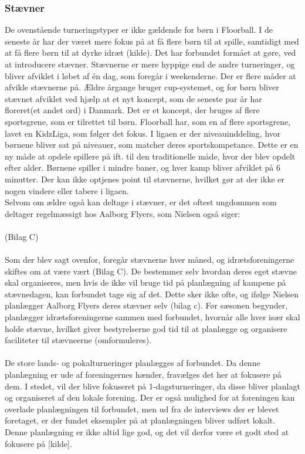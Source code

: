 \subsubsection{Stævner}
De ovenstående turneringstyper er ikke gældende for børn i Floorball. I de seneste år har der været mere fokus på at få flere børn til at spille, samtidigt med at få flere børn til at dyrke idræt (kilde). Det har forbundet formået at gøre, ved at introducere stævner. Stævnerne er mere hyppige end de andre turneringer, og bliver  afviklet i løbet af én dag, som foregår i weekenderne. Der er flere måder at afvikle stævnerne på. Ældre årgange bruger cup-systemet, og for børn bliver stævnet afviklet ved hjælp at et nyt koncept, som de seneste par år har floreret(et andet ord) i Danmark. Det er et koncept, der bruges af flere sportsgrene, som er tilrettet til børn.
Floorball har, som en af flere sportsgrene, lavet en KidzLiga, som følger det fokus. I ligaen er der niveauinddeling, hvor børnene bliver sat på niveauer, som matcher deres sportskompetance. Dette er en ny måde at opdele spillere på ift. til den traditionelle måde, hvor der blev opdelt efter alder. 
Børnene spiller i mindre baner, og hver kamp bliver afviklet på 6 minutter. Der kan ikke optjenes point til stævnerne, hvilket gør at der ikke er nogen vindere eller tabere i ligaen. 
\\
Selvom om ældre også kan deltage i stævner, er det oftest ungdommen som deltager regelmæssigt hos Aalborg Flyers, som Nielsen også siger: 
\\\\
 (Bilag C)
\\\\
Som der blev sagt ovenfor, foregår stævnerne hver måned, og idrætsforeningerne skiftes om at være vært (Bilag C). De bestemmer selv hvordan deres eget stævne skal organiseres, men hvis de ikke vil bruge tid på planlægning af kampene på stævnedagen, kan forbundet tage sig af det. Dette sker ikke ofte, og ifølge Nielsen planlægger Aalborg Flyers deres stævner selv (bilag c). Før sæsonen begynder, planlægger idrætsforeningerne sammen med forbundet, hvornår alle hver især skal holde stævne, hvilket giver bestyrelserne god tid til at planlægge og organisere faciliteter til stævneerne (omformuleres). 
\\\\ %
De store lands- og pokalturneringer planlægges af forbundet. Da denne planlægning er ude af foreningernes hænder, fravælges det her at fokusere på dem. I stedet, vil der blive fokuseret på 1-dagsturneringer, da disse bliver planlagt og organiseret af den lokale forening. Der er også mulighed for at foreningen kan overlade planlægningen til forbundet, men ud fra de interviews der er blevet foretaget, er der fundet eksempler på at planlægningen bliver udført lokalt. Denne planlægning er ikke altid lige god, og det vil derfor være et godt sted at fokusere på [kilde].
  
